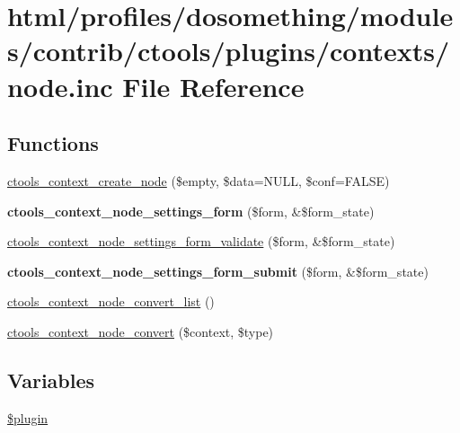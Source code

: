 \hypertarget{ctools_2plugins_2contexts_2node_8inc}{
\section{html/profiles/dosomething/modules/contrib/ctools/plugins/contexts/node.inc File Reference}
\label{ctools_2plugins_2contexts_2node_8inc}
}
\subsection*{Functions}
\begin{DoxyCompactItemize}
\item 
\hyperlink{ctools_2plugins_2contexts_2node_8inc_ac198dbec6d4d3f84b4c3264b27e647ad}{ctools\_\-context\_\-create\_\-node} (\$empty, \$data=NULL, \$conf=FALSE)
\item 
\hypertarget{ctools_2plugins_2contexts_2node_8inc_a1de84bb71419825d152ecb3aaa8f5fa6}{
{\bfseries ctools\_\-context\_\-node\_\-settings\_\-form} (\$form, \&\$form\_\-state)}
\label{ctools_2plugins_2contexts_2node_8inc_a1de84bb71419825d152ecb3aaa8f5fa6}

\item 
\hyperlink{ctools_2plugins_2contexts_2node_8inc_a451887cc1c3b00f3af081fd54e51adea}{ctools\_\-context\_\-node\_\-settings\_\-form\_\-validate} (\$form, \&\$form\_\-state)
\item 
\hypertarget{ctools_2plugins_2contexts_2node_8inc_a47240e473155c4c31d1d5aa1cf549baf}{
{\bfseries ctools\_\-context\_\-node\_\-settings\_\-form\_\-submit} (\$form, \&\$form\_\-state)}
\label{ctools_2plugins_2contexts_2node_8inc_a47240e473155c4c31d1d5aa1cf549baf}

\item 
\hyperlink{ctools_2plugins_2contexts_2node_8inc_a0fcbefea62745d0bcc96ee8ab7b25086}{ctools\_\-context\_\-node\_\-convert\_\-list} ()
\item 
\hyperlink{ctools_2plugins_2contexts_2node_8inc_a0ce0b7c1b8f5193407fa90f48c8d9fe6}{ctools\_\-context\_\-node\_\-convert} (\$context, \$type)
\end{DoxyCompactItemize}
\subsection*{Variables}
\begin{DoxyCompactItemize}
\item 
\hyperlink{ctools_2plugins_2contexts_2node_8inc_ada8a7130088351710bb02ed622d6bf65}{\$plugin}
\end{DoxyCompactItemize}


